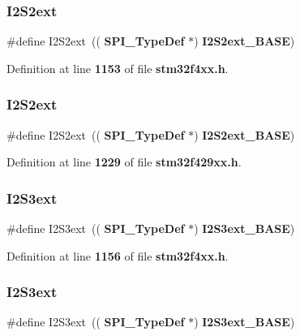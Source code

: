 \subsubsection{I2\+S2ext\hspace{0.1cm}{\footnotesize\ttfamily [1/2]}}
{\footnotesize\ttfamily \#define I2\+S2ext~((\textbf{ S\+P\+I\+\_\+\+Type\+Def} $\ast$) \textbf{ I2\+S2ext\+\_\+\+B\+A\+SE})}



Definition at line \textbf{ 1153} of file \textbf{ stm32f4xx.\+h}.

\mbox{\label{group__Peripheral__declaration_ga9efe6de71871a01dd38abcb229f30c02}} 
\subsubsection{I2\+S2ext\hspace{0.1cm}{\footnotesize\ttfamily [2/2]}}
{\footnotesize\ttfamily \#define I2\+S2ext~((\textbf{ S\+P\+I\+\_\+\+Type\+Def} $\ast$) \textbf{ I2\+S2ext\+\_\+\+B\+A\+SE})}



Definition at line \textbf{ 1229} of file \textbf{ stm32f429xx.\+h}.

\mbox{\label{group__Peripheral__declaration_ga15b3a03302ed53911099c5216da0b1cf}} 
\subsubsection{I2\+S3ext\hspace{0.1cm}{\footnotesize\ttfamily [1/2]}}
{\footnotesize\ttfamily \#define I2\+S3ext~((\textbf{ S\+P\+I\+\_\+\+Type\+Def} $\ast$) \textbf{ I2\+S3ext\+\_\+\+B\+A\+SE})}



Definition at line \textbf{ 1156} of file \textbf{ stm32f4xx.\+h}.

\mbox{\label{group__Peripheral__declaration_ga15b3a03302ed53911099c5216da0b1cf}} 
\subsubsection{I2\+S3ext\hspace{0.1cm}{\footnotesize\ttfamily [2/2]}}
{\footnotesize\ttfamily \#define I2\+S3ext~((\textbf{ S\+P\+I\+\_\+\+Type\+Def} $\ast$) \textbf{ I2\+S3ext\+\_\+\+B\+A\+SE})}




